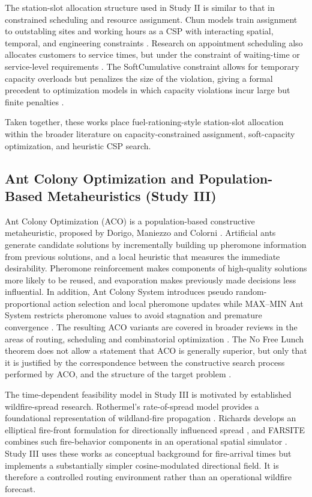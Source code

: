 \documentclass{ai-lab-report}
\begin{document}
The station-slot allocation structure used in Study II is similar to that in constrained scheduling and resource assignment. Chun models train assignment to outstabling sites and working hours as a CSP with interacting spatial, temporal, and engineering constraints \citep{chun2013outstable}. Research on appointment scheduling also allocates customers to service times, but under the constraint of waiting-time or service-level requirements \citep{benjaafar2023appointment}. The SoftCumulative constraint allows for temporary capacity overloads but penalizes the size of the violation, giving a formal precedent to optimization models in which capacity violations incur large but finite penalties \citep{ouellet2022softcumulative}.

Taken together, these works place fuel-rationing-style station-slot allocation within the broader literature on capacity-constrained assignment, soft-capacity optimization, and heuristic CSP search.

\subsection{Ant Colony Optimization and Population-Based Metaheuristics (Study III)}

Ant Colony Optimization (ACO) is a population-based constructive metaheuristic, proposed by Dorigo, Maniezzo and Colorni \citep{dorigo1996antsystem}. Artificial ants generate candidate solutions by incrementally building up pheromone information from previous solutions, and a local heuristic that measures the immediate desirability. Pheromone reinforcement makes components of high-quality solutions more likely to be reused, and evaporation makes previously made decisions less influential. In addition, Ant Colony System introduces pseudo random-proportional action selection and local pheromone updates \citep{dorigo1997acs} while MAX--MIN Ant System restricts pheromone values to avoid stagnation and premature convergence \citep{stutzle2000maxmin}. The resulting ACO variants are covered in broader reviews in the areas of routing, scheduling and combinatorial optimization \citep{dorigo2019aco}. The No Free Lunch theorem does not allow a statement that ACO is generally superior, but only that it is justified by the correspondence between the constructive search process performed by ACO, and the structure of the target problem \citep{wolpert1997nofreelunch}.

The time-dependent feasibility model in Study III is motivated by established wildfire-spread research. Rothermel's rate-of-spread model provides a foundational representation of wildland-fire propagation \citep{rothermel1972spread}. Richards develops an elliptical fire-front formulation for directionally influenced spread \citep{richards1990elliptical}, and FARSITE combines such fire-behavior components in an operational spatial simulator \citep{finney1998farsite}. Study III uses these works as conceptual background for fire-arrival times but implements a substantially simpler cosine-modulated directional field. It is therefore a controlled routing environment rather than an operational wildfire forecast.
\end{document}
